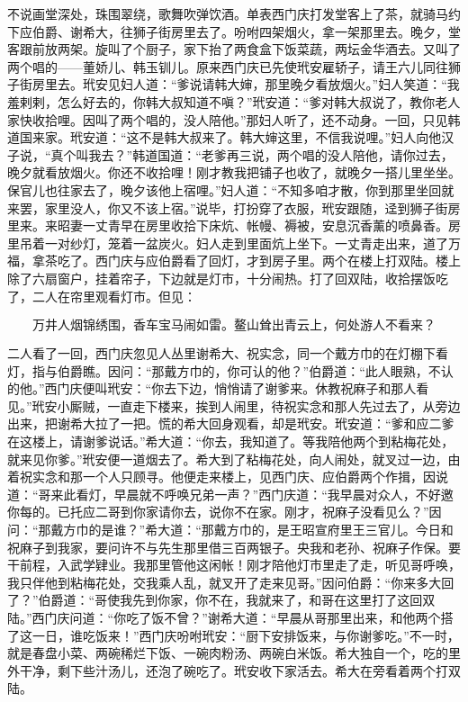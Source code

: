 不说画堂深处，珠围翠绕，歌舞吹弹饮酒。单表西门庆打发堂客上了茶，就骑马约下应伯爵、谢希大，往狮子街房里去了。吩咐四架烟火，拿一架那里去。晚夕，堂客跟前放两架。旋叫了个厨子，家下抬了两食盒下饭菜蔬，两坛金华酒去。又叫了两个唱的——董娇儿、韩玉钏儿。原来西门庆已先使玳安雇轿子，请王六儿同往狮子街房里去。玳安见妇人道：“爹说请韩大婶，那里晚夕看放烟火。”妇人笑道：“我羞剌剌，怎么好去的，你韩大叔知道不嗔？”玳安道：“爹对韩大叔说了，教你老人家快收拾哩。因叫了两个唱的，没人陪他。”那妇人听了，还不动身。一回，只见韩道国来家。玳安道：“这不是韩大叔来了。韩大婶这里，不信我说哩。”妇人向他汉子说，“真个叫我去？”韩道国道：“老爹再三说，两个唱的没人陪他，请你过去，晚夕就看放烟火。你还不收拾哩！刚才教我把铺子也收了，就晚夕一搭儿里坐坐。保官儿也往家去了，晚夕该他上宿哩。”妇人道：“不知多咱才散，你到那里坐回就来罢，家里没人，你又不该上宿。”说毕，打扮穿了衣服，玳安跟随，迳到狮子街房里来。来昭妻一丈青早在房里收拾下床炕、帐幔、褥被，安息沉香薰的喷鼻香。房里吊着一对纱灯，笼着一盆炭火。妇人走到里面炕上坐下。一丈青走出来，道了万福，拿茶吃了。西门庆与应伯爵看了回灯，才到房子里。两个在楼上打双陆。楼上除了六扇窗户，挂着帘子，下边就是灯市，十分闹热。打了回双陆，收拾摆饭吃了，二人在帘里观看灯市。但见：

\[
万井人烟锦绣围，香车宝马闹如雷。
鳌山耸出青云上，何处游人不看来？
\]

二人看了一回，西门庆忽见人丛里谢希大、祝实念，同一个戴方巾的在灯棚下看灯，指与伯爵瞧。因问：“那戴方巾的，你可认的他？”伯爵道：“此人眼熟，不认的他。”西门庆便叫玳安：“你去下边，悄悄请了谢爹来。休教祝麻子和那人看见。”玳安小厮贼，一直走下楼来，挨到人闹里，待祝实念和那人先过去了，从旁边出来，把谢希大拉了一把。慌的希大回身观看，却是玳安。玳安道：“爹和应二爹在这楼上，请谢爹说话。”希大道：“你去，我知道了。等我陪他两个到粘梅花处，就来见你爹。”玳安便一道烟去了。希大到了粘梅花处，向人闹处，就叉过一边，由着祝实念和那一个人只顾寻。他便走来楼上，见西门庆、应伯爵两个作揖，因说道：“哥来此看灯，早晨就不呼唤兄弟一声？”西门庆道：“我早晨对众人，不好邀你每的。已托应二哥到你家请你去，说你不在家。刚才，祝麻子没看见么？”因问：“那戴方巾的是谁？”希大道：“那戴方巾的，是王昭宣府里王三官儿。今日和祝麻子到我家，要问许不与先生那里借三百两银子。央我和老孙、祝麻子作保。要干前程，入武学肄业。我那里管他这闲帐！刚才陪他灯市里走了走，听见哥呼唤，我只伴他到粘梅花处，交我乘人乱，就叉开了走来见哥。”因问伯爵：“你来多大回了？”伯爵道：“哥使我先到你家，你不在，我就来了，和哥在这里打了这回双陆。”西门庆问道：“你吃了饭不曾？”谢希大道：“早晨从哥那里出来，和他两个搭了这一日，谁吃饭来！”西门庆吩咐玳安：“厨下安排饭来，与你谢爹吃。”不一时，就是春盘小菜、两碗稀烂下饭、一碗\textHuoChuan 肉粉汤、两碗白米饭。希大独自一个，吃的里外干净，剩下些汁汤儿，还泡了碗吃了。玳安收下家活去。希大在旁看着两个打双陆。

